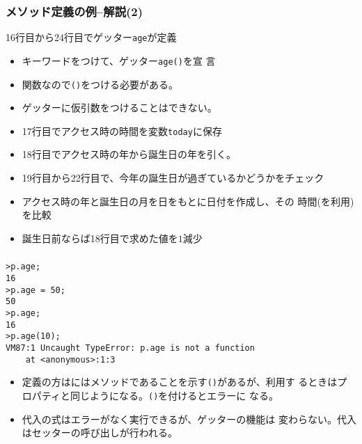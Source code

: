\begin{frame}[containsverbatim]
 \frametitle{メソッド定義の例--解説(2)}
 16行目から24行目でゲッター\texttt{age}が定義
\begin{itemize}
 \item キーワードをつけて、ゲッター\texttt{age()}を宣
       言
 \item 関数なので\texttt{()}をつける必要がある。
 \item ゲッターに仮引数をつけることはできない。
 \item 17行目でアクセス時の時間を変数\texttt{today}に保存
 \item 18行目でアクセス時の年から誕生日の年を引く。
 \item 19行目から22行目で、今年の誕生日が過ぎているかどうかをチェック
 \item アクセス時の年と誕生日の月を日をもとに日付を作成し、その
       時間(を利用)を比較
 \item 誕生日前ならば18行目で求めた値を$1$減少
\end{itemize}
\end{frame}
\begin{frame}[containsverbatim]
 \frametitle{}
\begin{Verbatim}
>p.age;
16
>p.age = 50;
50
>p.age;
16
>p.age(10);
VM87:1 Uncaught TypeError: p.age is not a function
    at <anonymous>:1:3
\end{Verbatim}
\begin{itemize}
 \item 定義の方はにはメソッドであることを示す\texttt{()}があるが、利用す
       るときはプロパティと同じようになる。\texttt{()}を付けるとエラーに
       なる。
 \item 代入の式はエラーがなく実行できるが、ゲッターの機能は
       変わらない。代入はセッターの呼び出しが行われる。
\end{itemize}
 \end{frame}
